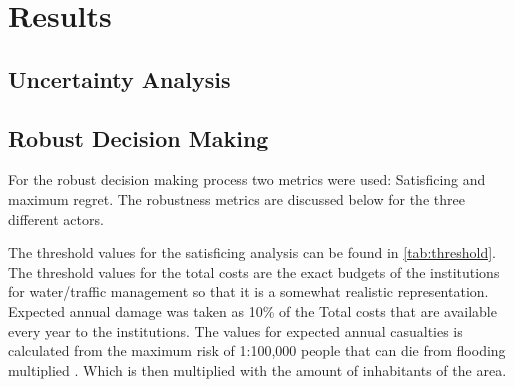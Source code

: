 \section{Results}
\label{s:results}


\subsection{Uncertainty Analysis}



\subsection{Robust Decision Making}
For the robust decision making process two metrics were used: Satisficing and maximum regret. The robustness metrics are discussed below for the three different actors.\newline

The threshold values for the satisficing analysis can be found in \autoref{tab:threshold}. The threshold values for the total costs are the exact budgets of the institutions for water/traffic management so that it is a somewhat realistic representation. Expected annual damage was taken as 10\% of the Total costs that are available every year to the institutions. The values for expected annual casualties is calculated from the maximum risk of 1:100,000 people that can die from flooding multiplied \cite{slootjesandvandermost_2016} . Which is then multiplied with the amount of inhabitants of the area.

